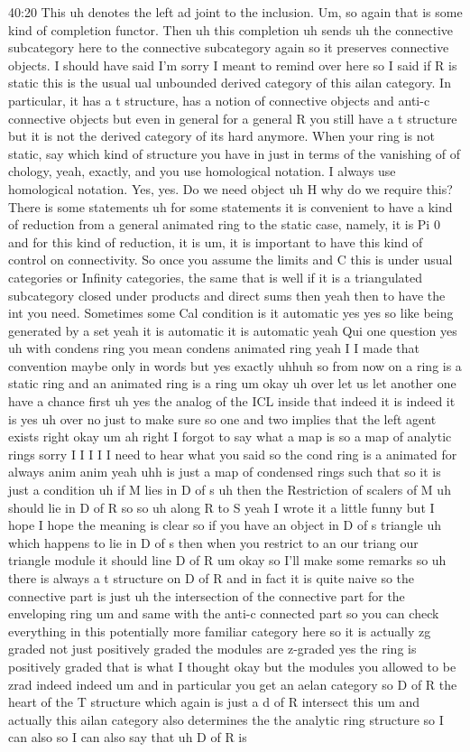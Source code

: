 \begin{unfinished}{40:20}
This uh denotes the left ad joint to the inclusion. Um, so again that is some kind of completion functor. Then uh this completion uh sends uh the connective subcategory here to the connective subcategory again so it preserves connective objects. I should have said I'm sorry I meant to remind over here so I said if R is static this is the usual ual unbounded derived category of this ailan category. In particular, it has a t structure, has a notion of connective objects and anti-c connective objects but even in general for a general R you still have a t structure but it is not the derived category of its hard anymore. When your ring is not static, say which kind of structure you have in just in terms of the vanishing of of chology, yeah, exactly, and you use homological notation. I always use homological notation. Yes, yes. Do we need object uh H why do we require this? There is  some statements uh for some statements it is convenient to have a kind of reduction from a general animated ring to the static case, namely, it is Pi 0 and for this kind of reduction, it is um, it is important to have this kind of control on connectivity. So once you assume the limits and C this is under usual categories or Infinity categories, the same that is well if it is a triangulated subcategory closed under products and direct sums then yeah then to have the int you need. Sometimes some Cal condition is it automatic yes yes so like being generated by a set yeah it is automatic it is automatic yeah Qui one question yes uh with condens ring you mean condens animated ring yeah I I made that convention maybe only in words but yes exactly uhhuh so from now on a ring is a static ring and an animated ring is a ring um okay uh over let us let another one have a chance first uh yes the analog of the ICL inside that indeed it is indeed it is yes uh over no just to make sure so one and two implies that the left agent exists right okay um ah right I forgot to say what a map is so a map of analytic rings sorry I I I I I need to hear what you said so the cond ring is a animated for always anim anim yeah uhh is just a map of condensed rings such that so it is just a condition uh if M lies in D of s uh then the Restriction of scalers of M uh should lie in D of R so so uh along R to S yeah I wrote it a little funny but I hope I hope the meaning is clear so if you have an object in D of s triangle uh which happens to lie in D of s then when you restrict to an our triang our triangle module it should line D of R um okay so I'll make some remarks so uh there is always a t structure on D of R and in fact it is quite naive so the connective part is just uh the intersection of the connective part for the enveloping ring um and same with the anti-c connected part so you can check everything in this potentially more familiar category here so it is actually zg graded not just positively graded the modules are z-graded yes the ring is positively graded that is what I thought okay but the modules you allowed to be zrad indeed indeed um and in particular you get an aelan category so D of R the heart of the T structure which again is just a d of R intersect this um and actually this ailan category also determines the the analytic ring structure so I can also so I can also say that uh D of R is 
\end{unfinished}
